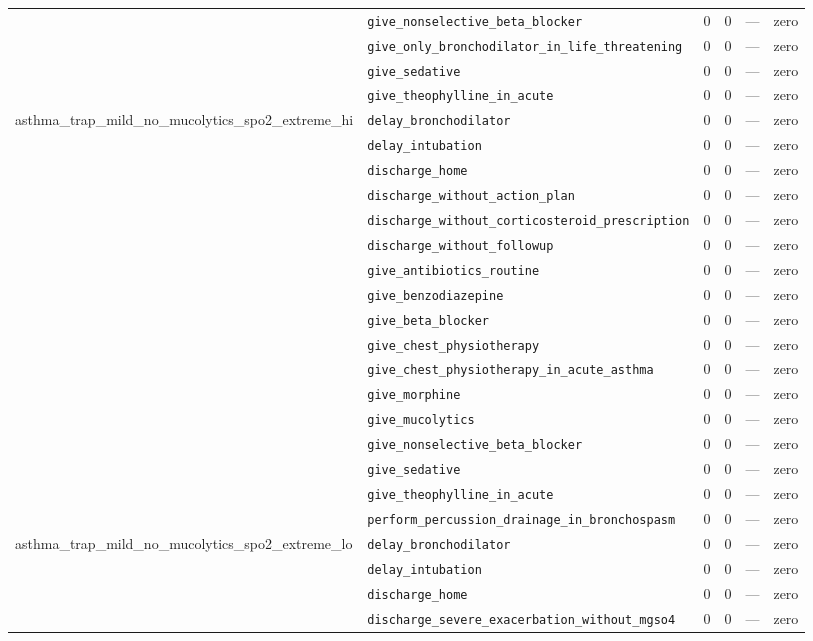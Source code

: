 \begin{table}[ht]
\begin{tabular}{llrrrl}
 & \texttt{give\_nonselective\_beta\_blocker} & 0 & 0 & — & zero \\
 & \texttt{give\_only\_bronchodilator\_in\_life\_threatening} & 0 & 0 & — & zero \\
 & \texttt{give\_sedative} & 0 & 0 & — & zero \\
 & \texttt{give\_theophylline\_in\_acute} & 0 & 0 & — & zero \\
\midrule
asthma\_trap\_mild\_no\_mucolytics\_spo2\_extreme\_hi & \texttt{delay\_bronchodilator} & 0 & 0 & — & zero \\
 & \texttt{delay\_intubation} & 0 & 0 & — & zero \\
 & \texttt{discharge\_home} & 0 & 0 & — & zero \\
 & \texttt{discharge\_without\_action\_plan} & 0 & 0 & — & zero \\
 & \texttt{discharge\_without\_corticosteroid\_prescription} & 0 & 0 & — & zero \\
 & \texttt{discharge\_without\_followup} & 0 & 0 & — & zero \\
 & \texttt{give\_antibiotics\_routine} & 0 & 0 & — & zero \\
 & \texttt{give\_benzodiazepine} & 0 & 0 & — & zero \\
 & \texttt{give\_beta\_blocker} & 0 & 0 & — & zero \\
 & \texttt{give\_chest\_physiotherapy} & 0 & 0 & — & zero \\
 & \texttt{give\_chest\_physiotherapy\_in\_acute\_asthma} & 0 & 0 & — & zero \\
 & \texttt{give\_morphine} & 0 & 0 & — & zero \\
 & \texttt{give\_mucolytics} & 0 & 0 & — & zero \\
 & \texttt{give\_nonselective\_beta\_blocker} & 0 & 0 & — & zero \\
 & \texttt{give\_sedative} & 0 & 0 & — & zero \\
 & \texttt{give\_theophylline\_in\_acute} & 0 & 0 & — & zero \\
 & \texttt{perform\_percussion\_drainage\_in\_bronchospasm} & 0 & 0 & — & zero \\
\midrule
asthma\_trap\_mild\_no\_mucolytics\_spo2\_extreme\_lo & \texttt{delay\_bronchodilator} & 0 & 0 & — & zero \\
 & \texttt{delay\_intubation} & 0 & 0 & — & zero \\
 & \texttt{discharge\_home} & 0 & 0 & — & zero \\
 & \texttt{discharge\_severe\_exacerbation\_without\_mgso4} & 0 & 0 & — & zero \\

\end{tabular}
\end{table}
